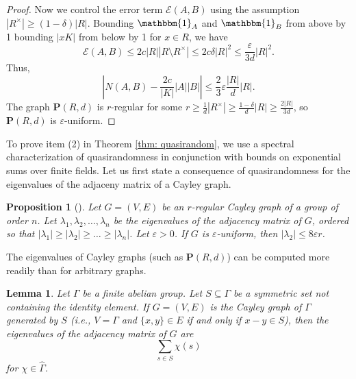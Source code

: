 \documentclass{amsart}
\newtheorem{lemma}[theorem]{Lemma}
\newtheorem{proposition}[theorem]{Proposition}
\theoremstyle{definition}
\numberwithin{equation}{section}
\newcommand{\bfP}{\mathbf{P}}
\newcommand{\eps}{\varepsilon}
\renewcommand{\hat}{\widehat}
\newcommand{\ind}{\mathbbm{1}}
\begin{document}
\begin{proof}
    Now we control the error term $\mathcal{E}(A,B)$ using the assumption $|R^{\times}| \ge (1-\delta)|R|$.
    Bounding $\ind_A$ and $\ind_B$ from above by 1 bounding $|xK|$ from below by 1 for $x \in R$, we have
    \begin{equation*}
        \mathcal{E}(A,B) \le 2 c |R| |R \setminus R^{\times}| \le 2c\delta |R|^2 \le \frac{\eps}{3d} |R|^2.
    \end{equation*}
    Thus,
    \begin{equation*}
        \left| N(A,B) - \frac{2c}{|K|} |A||B| \right| \le \frac{2}{3} \eps \frac{|R|}{d} |R|.
    \end{equation*}
    The graph $\mathbf{P}(R,d)$ is $r$-regular for some $r \ge \frac{1}{d} |R^{\times}| \ge \frac{1-\delta}{d} |R| \ge \frac{2|R|}{3d}$, so $\bfP(R,d)$ is $\eps$-uniform.
\end{proof}

To prove item (2) in Theorem \ref{thm: quasirandom}, we use a spectral characterization of quasirandomness in conjunction with bounds on exponential sums over finite fields.
Let us first state a consequence of quasirandomness for the eigenvalues of the adjaceny matrix of a Cayley graph.

\begin{proposition}[{\cite[Theorem 1.4]{cz}}] \label{prop: quasirandom eigenvalues}
    Let $G = (V,E)$ be an $r$-regular Cayley graph of a group of order $n$.
    Let $\lambda_1, \lambda_2, \ldots, \lambda_n$ be the eigenvalues of the adjacency matrix of $G$, ordered so that $|\lambda_1| \ge |\lambda_2| \ge \ldots \ge |\lambda_n|$.
    Let $\eps > 0$.
    If $G$ is $\eps$-uniform, then $|\lambda_2| \le 8\eps r$.
\end{proposition}

The eigenvalues of Cayley graphs (such as $\bfP(R,d)$) can be computed more readily than for arbitrary graphs.

\begin{lemma} \label{lem: eigenvalues of Cayley graph}
    Let $\Gamma$ be a finite abelian group.
    Let $S \subseteq \Gamma$ be a symmetric set not containing the identity element.
    If $G = (V,E)$ is the Cayley graph of $\Gamma$ generated by $S$ (i.e., $V = \Gamma$ and $\{x,y\} \in E$ if and only if $x-y \in S$), then the eigenvalues of the adjacency matrix of $G$ are
    \begin{equation*}
        \sum_{s \in S} \chi(s)
    \end{equation*}
    for $\chi \in \hat{\Gamma}$.
\end{lemma}
\end{document}
